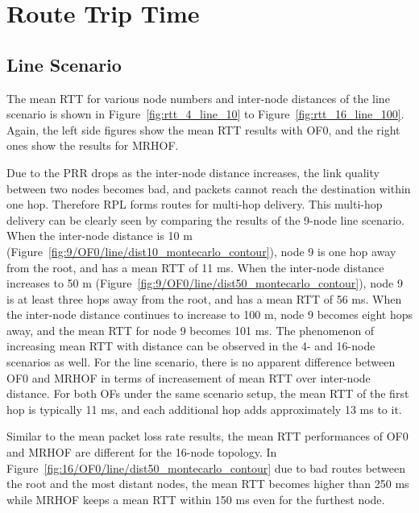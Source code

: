 \section{Route Trip Time}
\label{rtt}

\subsection{Line Scenario}
\label{rtt:line}

The mean RTT for various node numbers and inter-node distances of the line scenario is shown in Figure~\ref{fig:rtt_4_line_10} to Figure~\ref{fig:rtt_16_line_100}. Again, the left side figures show the mean RTT results with OF0, and the right ones show the results for MRHOF.

Due to the PRR drops as the inter-node distance increases, the link quality between two nodes becomes bad, and packets cannot reach the destination within one hop. Therefore RPL forms routes for multi-hop delivery. This multi-hop delivery can be clearly seen by comparing the results of the 9-node line scenario. When the inter-node distance is 10 m (Figure~\ref{fig:9/OF0/line/dist10_montecarlo_contour}), node 9 is one hop away from the root, and has a mean RTT of 11 ms. When the inter-node distance increases to 50 m (Figure~\ref{fig:9/OF0/line/dist50_montecarlo_contour}), node 9 is at least three hops away from the root, and has a mean RTT of 56 ms. When the inter-node distance continues to increase to 100 m, node 9 becomes eight hops away, and the mean RTT for node 9 becomes 101 ms. The phenomenon of increasing mean RTT with distance can be observed in the 4- and 16-node scenarios as well. For the line scenario, there is no apparent difference between OF0 and MRHOF in terms of increasement of mean RTT over inter-node distance. For both OFs under the same scenario setup, the mean RTT of the first hop is typically 11 ms, and each additional hop adds approximately 13 ms to it.

Similar to the mean packet loss rate results, the mean RTT performances of OF0 and MRHOF are different for the 16-node topology. In Figure~\ref{fig:16/OF0/line/dist50_montecarlo_contour} due to bad routes between the root and the most distant nodes, the mean RTT becomes higher than 250 ms while MRHOF keeps a mean RTT within 150 ms even for the furthest node.

